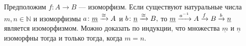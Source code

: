 \documentclass[../main/CT4S-EN-RU]{subfiles}
\begin{document}
\begin{proofRUS}
Предположим $f\colon A{→} B$ — изоморфизм. Если существуют натуральные числа $m,n\in{ℕ}$ и изоморфизмы $a\colon\underline{m}\xrightarrow{\cong} A$ и $b\colon\underline{n}\xrightarrow{\cong} B,$ то $\underline{m}\xrightarrow{a^{-1}}A\xrightarrow{f}B\xrightarrow{b}\underline{n}$ является изоморфизмом. Можно доказать по индукции, что множества $\underline{m}$ и $\underline{n}$ изоморфны тогда и только тогда, когда $m=n.$ 
\end{proofRUS}
\end{document}

